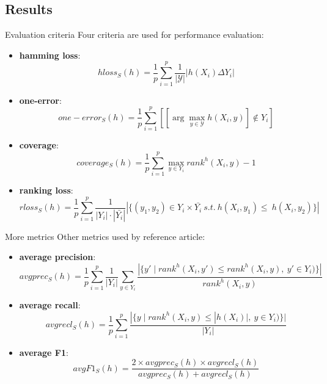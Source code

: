 \subsection{Results}
\begin{frame}{Evaluation criteria}
	Four criteria are used for performance evaluation:
	\begin{small}
	
	\begin{itemize}
		\item \textbf{hamming loss}: 
		$$hloss_S(h) = \dfrac{1}{p}\sum_{i=1}^{p}\frac{1}{|\mathcal{Y}|}|h(X_i)\Delta Y_i|$$
		\item \textbf{one-error}: 
		$$one-error_S(h)=\dfrac{1}{p}\sum_{i=1}^{p}[[\arg \max_{y \in \mathcal{Y}} h(X_i,y)]\notin Y_i]$$
		\item \textbf{coverage}: 
		$$coverage_S(h)=\dfrac{1}{p}\sum_{i=1}^{p}\max_{y \in Y_i}rank^h(X_i,y)-1$$
		\item \textbf{ranking loss}: 
		$$rloss_S(h) = \dfrac{1}{p}\sum_{i=1}^{p} \frac{1}{|Y_i| \cdot |\bar{Y_i}|}
		| \{ (y_1,y_2) \in Y_i \times \bar{Y_i} \ s.t. \ h(X_i,y_1)\leq \ h(X_i,y_2) \} |$$
	\end{itemize}
	
	\end{small}
\end{frame}

\begin{frame}{More metrics}
	Other metrics used by reference article:
	\begin{small}
	
	\begin{itemize}
	\item \textbf{average precision}: 
	$$avgprec_S(h) = \dfrac{1}{p}\sum_{i=1}^{p}\frac{1}{|Y_i|}\sum_{y \in Y_i} \dfrac{| \{ y' \mid rank^h(X_i,y') \leq rank^h(X_i,y), \ y' \in Y_i) \} |}{rank^h(X_i,y)}$$
	\item \textbf{average recall}: 
	$$avgrecl_S(h) = \dfrac{1}{p}\sum_{i=1}^{p} \dfrac{| \{ y \mid rank^h(X_i,y) \leq |h(X_i)|, \ y \in Y_i) \} |}{|Y_i|}$$
	\item \textbf{average F1}: 
	$$avgF1_S(h) = \dfrac{2\times avgprec_S(h)\times avgrecl_S(h)}{avgprec_S(h)+avgrecl_S(h)}$$
	\end{itemize}
	
	\end{small}
	\begin{flushright}
		\cite{metrics}
	\end{flushright}
\end{frame}


